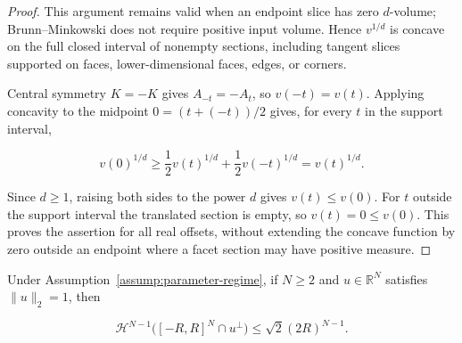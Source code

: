 \begin{proof}
This argument remains valid when an endpoint slice has zero \(d\)-volume; Brunn--Minkowski does not require positive input volume. Hence \(v^{1/d}\) is concave on the full closed interval of nonempty sections, including tangent slices supported on faces, lower-dimensional faces, edges, or corners.

Central symmetry \(K=-K\) gives \(A_{-t}=-A_t\), so \(v(-t)=v(t)\). Applying concavity to the midpoint \(0=(t+(-t))/2\) gives, for every \(t\) in the support interval,

\begin{equation}
\label{eq:appendix-display-158}
v(0)^{1/d}
\geq\frac12v(t)^{1/d}+\frac12v(-t)^{1/d}
=v(t)^{1/d}.
\end{equation}

Since \(d\geq1\), raising both sides to the power \(d\) gives \(v(t)\leq v(0)\). For \(t\) outside the support interval the translated section is empty, so \(v(t)=0\leq v(0)\). This proves the assertion for all real offsets, without extending the concave function by zero outside an endpoint where a facet section may have positive measure.
\end{proof}

\begin{lemma}
\label{lem:step-005-ball-scaling}
Under Assumption~\ref{assump:parameter-regime}, if \(N\geq2\) and \(u\in\mathbb R^N\) satisfies \(\|u\|_2=1\), then

\begin{equation}
\label{eq:appendix-display-159}
\mathcal H^{N-1}\bigl([-R,R]^N\cap u^\perp\bigr)
\leq\sqrt2(2R)^{N-1}.
\end{equation}


\end{lemma}

